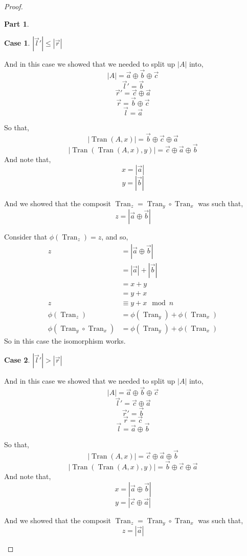\documentclass[12pt]{book}
\theoremstyle{plain}
\theoremstyle{definition}
\theoremstyle{ppart}
\newtheorem{ppart}{Part}
\theoremstyle{case}
\newtheorem{case}{Case}
\theoremstyle{solution}
\DeclareMathOperator{\Tran}{Tran}
\begin{document}
\begin{proof}
\begin{ppart}
\setcounter{case}{0}
\begin{case} $|\vec{l}'| \le |\vec{r}|$

And in this case we showed that we needed to split up $|A|$ into,
\[ |A| = \vec{a} \oplus \vec{b} \oplus \vec{c} \]
\[ \vec{l}' = \vec{b} \]
\[ \vec{r}' = \vec{c} \oplus \vec{a} \]
\[ \vec{r} = \vec{b} \oplus \vec{c} \]
\[ \vec{l} = \vec{a} \]

So that,
\[ |\Tran(A, x)| = \vec{b} \oplus \vec{c} \oplus \vec{a} \]
\[ |\Tran(\Tran(A, x), y)| = \vec{c} \oplus \vec{a} \oplus \vec{b} \]
And note that,
\[ x = |\vec{a}| \]
\[ y = |\vec{b}| \]

And we showed that the composit $\Tran_z = \Tran_y \circ \Tran_x$ was such
that,
\[ z = |\vec{a} \oplus \vec{b}| \]

Consider that $\phi(\Tran_z) = z$, and so,
\begin{align*}
  z
  &= |\vec{a} \oplus \vec{b}| \\
  &= |\vec{a}| + |\vec{b}| \\
  &= x + y \\
  &= y + x \\
  z &\equiv y + x \mod n \\
  \phi(\Tran_z) &= \phi(\Tran_y) + \phi(\Tran_x) \\
  \phi(\Tran_y \circ \Tran_x) &= \phi(\Tran_y) + \phi(\Tran_x)
\end{align*}
So in this case the isomorphism works.
\end{case}

\begin{case} $|\vec{l}'| > |\vec{r}|$

And in this case we showed that we needed to split up $|A|$ into,
\[ |A| = \vec{a} \oplus \vec{b} \oplus \vec{c} \]
\[ \vec{l}' = \vec{c} \oplus \vec{a} \]
\[ \vec{r}' = \vec{b} \]
\[ \vec{r} = \vec{c} \]
\[ \vec{l} = \vec{a} \oplus \vec{b} \]

So that,
\[ |\Tran(A, x)| = \vec{c} \oplus \vec{a} \oplus \vec{b} \]
\[ |\Tran(\Tran(A, x), y)| = \vec{b} \oplus \vec{c} \oplus \vec{a} \]
And note that,
\[ x = |\vec{a} \oplus \vec{b}| \]
\[ y = |\vec{c} \oplus \vec{a}| \]

And we showed that the composit $\Tran_z = \Tran_y \circ \Tran_x$ was such
that,
\[ z = |\vec{a}| \]


\end{case}
\end{ppart}
\end{proof}
\end{document}
